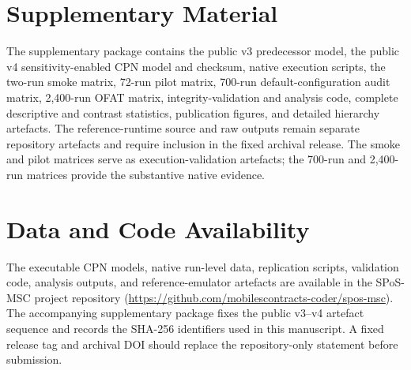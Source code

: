 \documentclass[a4paper,fleqn]{cas-sc}
\begin{document}
\section*{Supplementary Material}
\label{supplementary}

The supplementary package contains the public v3 predecessor model, the public
v4 sensitivity-enabled CPN model and checksum, native execution scripts, the
two-run smoke matrix, 72-run pilot matrix, 700-run default-configuration audit
matrix, 2,400-run OFAT matrix, integrity-validation and analysis code, complete
descriptive and contrast statistics, publication figures, and detailed
hierarchy artefacts. The reference-runtime source and raw outputs remain separate repository
artefacts and require inclusion in the fixed archival release. The smoke and
pilot matrices serve
as execution-validation artefacts; the 700-run and 2,400-run matrices provide
the substantive native evidence.


\section*{Data and Code Availability}
The executable CPN models, native run-level data, replication scripts,
validation code, analysis outputs, and reference-emulator artefacts are
available in the SPoS-MSC project repository
(\url{https://github.com/mobilescontracts-coder/spos-msc}). The accompanying
supplementary package fixes the public v3--v4 artefact sequence and records the
SHA-256 identifiers used in this manuscript. A fixed release tag and archival
DOI should replace the repository-only statement before submission.

\FloatBarrier



\end{document}
